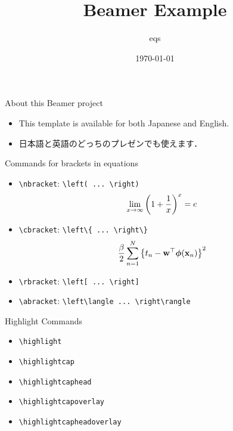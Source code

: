 \documentclass{beamer}
\title{Beamer Example}
\author{eqs}
\date{\today}
\begin{document}
    \begin{frame}[plain]
        \maketitle
    \end{frame}

    \begin{frame}{About this Beamer project}
        \begin{itemize}
            \item This template is available for both Japanese and English.
            \item 日本語と英語のどっちのプレゼンでも使えます．
        \end{itemize}
    \end{frame}

    \begin{frame}[fragile]{Commands for brackets in equations}
        \begin{itemize}
            \item \verb|\nbracket|: \verb|\left( ... \right)|
                \begin{align*}
                    \lim_{x \to \infty} \left( 1 + \frac{1}{x} \right)^x = e
                \end{align*}
            \item \verb|\cbracket|: \verb|\left\{ ... \right\}|
                \begin{align*}
                    \frac{\beta}{2}\sum_{n=1}^N \left\{ t_n - \mathbf w^\top\boldsymbol\phi(\mathbf x_n) \right\}^2
                \end{align*}
            \item \verb|\rbracket|: \verb|\left[ ... \right]|
            \item \verb|\abracket|: \verb|\left\langle ... \right\rangle|
        \end{itemize}
    \end{frame}

    \begin{frame}[fragile]{Highlight Commands}
        \begin{itemize}
            \item \verb|\highlight|
            \item \verb|\highlightcap|
            \item \verb|\highlightcaphead|
            \item \verb|\highlightcapoverlay|
            \item \verb|\highlightcapheadoverlay|
        \end{itemize}
    \end{frame}
\end{document}
